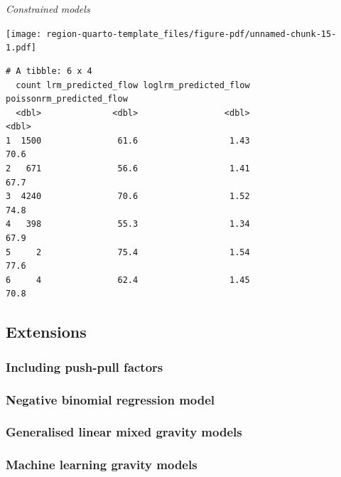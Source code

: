 \documentclass[
  a4paper, 
  twoside,
  final
]{article}
\newenvironment{Shaded}{\begin{snugshade}}{\end{snugshade}}
\begin{document}
\emph{Constrained models}

\texttt{[image: region-quarto-template\_files/figure-pdf/unnamed-chunk-15-1.pdf]}

\begin{verbatim}
# A tibble: 6 x 4
  count lrm_predicted_flow loglrm_predicted_flow poissonrm_predicted_flow
  <dbl>              <dbl>                 <dbl>                    <dbl>
1  1500               61.6                  1.43                     70.6
2   671               56.6                  1.41                     67.7
3  4240               70.6                  1.52                     74.8
4   398               55.3                  1.34                     67.9
5     2               75.4                  1.54                     77.6
6     4               62.4                  1.45                     70.8
\end{verbatim}

\begin{Shaded}
\begin{Highlighting}[]

\end{Highlighting}
\end{Shaded}

\hypertarget{extensions}{%
\subsection{Extensions}\label{extensions}}

\hypertarget{including-push-pull-factors}{%
\subsubsection{Including push-pull
factors}\label{including-push-pull-factors}}

\hypertarget{negative-binomial-regression-model}{%
\subsubsection{Negative binomial regression
model}\label{negative-binomial-regression-model}}

\hypertarget{generalised-linear-mixed-gravity-models}{%
\subsubsection{Generalised linear mixed gravity
models}\label{generalised-linear-mixed-gravity-models}}

\hypertarget{machine-learning-gravity-models}{%
\subsubsection{Machine learning gravity
models}\label{machine-learning-gravity-models}}
\end{document}
